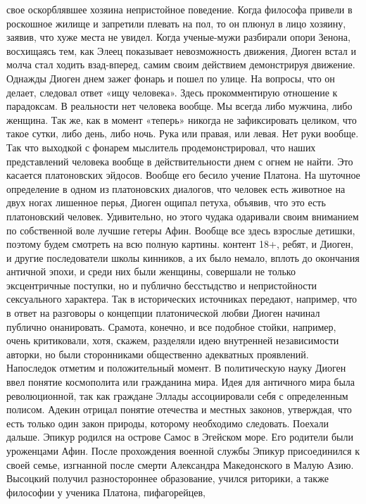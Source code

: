 свое оскорблявшее хозяина непристойное поведение. Когда философа привели в
роскошное жилище и запретили плевать на пол, то он плюнул в лицо хозяину,
заявив, что хуже места не увидел. Когда ученые-мужи разбирали опори Зенона,
восхищаясь тем, как Элеец показывает невозможность движения, Диоген встал и
молча стал ходить взад-вперед, самим своим действием демонстрируя движение.
Однажды Диоген днем зажег фонарь и пошел по улице. На вопросы, что он делает,
следовал ответ «ищу человека». Здесь прокомментирую отношение к парадоксам. В
реальности нет человека вообще. Мы всегда либо мужчина, либо женщина. Так же,
как в момент «теперь» никогда не зафиксировать целиком, что такое сутки, либо
день, либо ночь. Рука или правая, или левая. Нет руки вообще. Так что выходкой с
фонарем мыслитель продемонстрировал, что наших представлений человека вообще в
действительности днем с огнем не найти. Это касается платоновских эйдосов.
Вообще его бесило учение Платона. На шуточное определение в одном из
платоновских диалогов, что человек есть животное на двух ногах лишенное перья,
Диоген ощипал петуха, объявив, что это есть платоновский человек. Удивительно,
но этого чудака одаривали своим вниманием по собственной воле лучшие гетеры
Афин. Вообще все здесь взрослые детишки, поэтому будем смотреть на всю полную
картины. контент 18+, ребят, и Диоген, и другие последователи школы кинников, а
их было немало, вплоть до окончания античной эпохи, и среди них были женщины,
совершали не только эксцентричные поступки, но и публично бесстыдство и
непристойности сексуального характера. Так в исторических источниках передают,
например, что в ответ на разговоры о концепции платонической любви Диоген
начинал публично онанировать. Срамота, конечно, и все подобное стойки, например,
очень критиковали, хотя, скажем, разделяли идею внутренней независимости
авторки, но были сторонниками общественно адекватных проявлений. Напоследок
отметим и положительный момент. В политическую науку Диоген ввел понятие
космополита или гражданина мира. Идея для античного мира была революционной, так
как граждане Эллады ассоциировали себя с определенным полисом. Адекин отрицал
понятие отечества и местных законов, утверждая, что есть только один закон
природы, которому необходимо следовать. Поехали дальше. Эпикур родился на
острове Самос в Эгейском море. Его родители были уроженцами Афин. После
прохождения военной службы Эпикур присоединился к своей семье, изгнанной после
смерти Александра Македонского в Малую Азию. Высоцкий получил разностороннее
образование, учился риторики, а также философии у ученика Платона, пифагорейцев,
